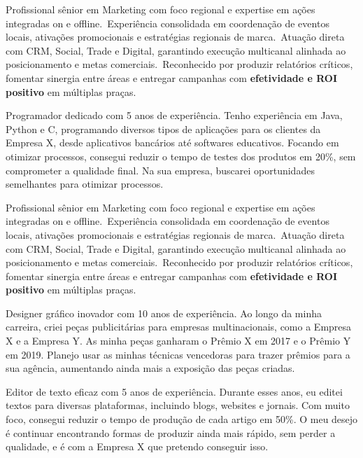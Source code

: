 \begin{commentA}
  Profissional sênior em Marketing com foco regional e expertise em ações integradas on e offline.\
Experiência consolidada em coordenação de eventos locais, ativações promocionais e estratégias regionais de marca.\
Atuação direta com CRM, Social, Trade e Digital, garantindo execução multicanal alinhada ao posicionamento e metas comerciais.\
Reconhecido por produzir relatórios críticos, fomentar sinergia entre áreas e entregar campanhas com \textbf{efetividade e ROI positivo} em múltiplas praças.
\end{commentA}
\begin{commentB}
  Programador dedicado com 5 anos de experiência. Tenho experiência em Java, Python e C, programando diversos tipos de aplicações para os clientes da Empresa X, desde aplicativos bancários até softwares educativos. Focando em otimizar processos, consegui reduzir o tempo de testes dos produtos em 20\%, sem comprometer a qualidade final. Na sua empresa, buscarei oportunidades semelhantes para otimizar processos.
\end{commentB}
\begin{commentC}
  Profissional sênior em Marketing com foco regional e expertise em ações integradas on e offline.\
Experiência consolidada em coordenação de eventos locais, ativações promocionais e estratégias regionais de marca.\
Atuação direta com CRM, Social, Trade e Digital, garantindo execução multicanal alinhada ao posicionamento e metas comerciais.\
Reconhecido por produzir relatórios críticos, fomentar sinergia entre áreas e entregar campanhas com \textbf{efetividade e ROI positivo} em múltiplas praças.
\end{commentC}
\begin{commentD}
  Designer gráfico inovador com 10 anos de experiência. Ao longo da minha carreira, criei peças publicitárias para empresas multinacionais, como a Empresa X e a Empresa Y. As minha peças ganharam o Prêmio X em 2017 e o Prêmio Y em 2019. Planejo usar as minhas técnicas vencedoras para trazer prêmios para a sua agência, aumentando ainda mais a exposição das peças criadas.
\end{commentD}
\begin{commentE}
  Editor de texto eficaz com 5 anos de experiência. Durante esses anos, eu editei textos para diversas plataformas, incluindo blogs, websites e jornais. Com muito foco, consegui reduzir o tempo de produção de cada artigo em 50\%. O meu desejo é continuar encontrando formas de produzir ainda mais rápido, sem perder a qualidade, e é com a Empresa X que pretendo conseguir isso.
\end{commentE}
